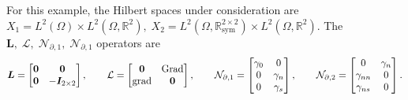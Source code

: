 For this example, the Hilbert spaces under consideration are $X_1 = L^2(\Omega) \times L^2(\Omega, \mathbb{R}^2), \; X_2 = L^2(\Omega, \mathbb{R}^{2\times 2}_{\text{sym}}) \times L^2(\Omega, \mathbb{R}^2)$. The $\bm{L}, \; \mathcal{L}, \; \mathcal{N}_{\partial, 1}, \; \mathcal{N}_{\partial, 1}$ operators are 
\begin{equation}
\bm{L} = \begin{bmatrix}
\bm{0}  & \bm{0}  \\
\bm{0} & -\bm{I}_{2 \times 2} \\
\end{bmatrix}, \qquad
\mathcal{L} = \begin{bmatrix}
\bm{0} & \operatorname*{Grad}\\
\operatorname*{grad} & \bm{0}\\
\end{bmatrix}, \qquad
\mathcal{N}_{\partial, 1} = \begin{bmatrix}
\gamma_0 & 0 \\ 
0 & \gamma_n \\
0 & \gamma_s \\
\end{bmatrix}, \qquad 
\mathcal{N}_{\partial, 2} = \begin{bmatrix}
0 & \gamma_{n}  \\
\gamma_{nn} & 0 \\
\gamma_{ns} & 0\\
\end{bmatrix}.
\end{equation}

